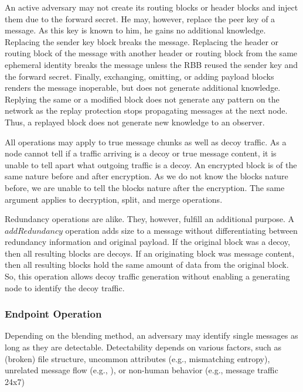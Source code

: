 \documentclass[10pt,journal,compsoc,twocolumn,twoside]{IEEEtran}
\begin{document}
An active adversary may not create its routing blocks or header blocks and inject them due to the forward secret. He may, however, replace the peer key of a message. As this key is known to him, he gains no additional knowledge. Replacing the sender key block breaks the message. Replacing the header or routing block of the message with another header or routing block from the same ephemeral identity breaks the message unless the RBB reused the sender key and the forward secret. Finally, exchanging, omitting, or adding payload blocks renders the message inoperable, but does not generate additional knowledge. Replying the same or a modified block does not generate any pattern on the network as the replay protection stops propagating messages at the next node. Thus, a replayed block does not generate new knowledge to an observer.

All operations may apply to true message chunks as well as decoy traffic. As a node cannot tell if a traffic arriving is a decoy or true message content, it is unable to tell apart what outgoing traffic is a decoy. An encrypted block is of the same nature before and after encryption. As we do not know the blocks nature before, we are unable to tell the blocks nature after the encryption. The same argument applies to decryption, split, and merge operations. 

Redundancy operations are alike. They, however, fulfill an additional purpose. A $addRedundancy$ operation adds size to a message without differentiating between redundancy information and original payload. If the original block was a decoy, then all resulting blocks are decoys. If an originating block was message content, then all resulting blocks hold the same amount of data from the original block. So, this operation allows decoy traffic generation without enabling a generating node to identify the decoy traffic.

\subsubsection{Endpoint Operation}
Depending on the blending method, an adversary may identify single messages as long as they are detectable. Detectability depends on various factors, such as (broken) file structure, uncommon attributes (e.g., mismatching entropy), unrelated message flow (e.g., \cite{oakland2013-parrot}), or non-human behavior (e.g., message traffic 24x7)
\end{document}
